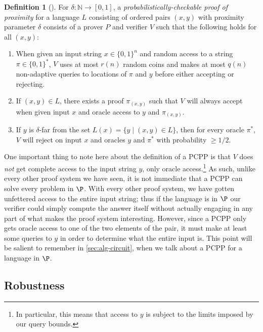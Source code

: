 \documentclass[english,12pt]{reedthesis}
\theoremstyle{plain}
\theoremstyle{definition}
\newtheorem{defn}[defn]{Definition}
\theoremstyle{remark}
\begin{document}
\begin{defn}[{\cite[Def.\ 2.2]{GOS25}}]\label{def:pcpp}
  For $\delta\colon \mathbb{N} \rightarrow [0, 1]$, a \emph{probabilistically-checkable proof of
    proximity} for a language $L$ consisting of ordered pairs $(x, y)$ with
  proximity parameter $\delta$ consists of a prover $P$ and verifier $V$ such that
  the following holds for all $(x, y)$:
  \begin{enumerate}
    \item When given an input string $x \in \{0, 1\}^{n}$ and random access to a
          string $\pi \in \{0, 1\}^{*}$, $V$ uses at most $r(n)$ random coins and
          makes at most $q(n)$ non-adaptive queries to locations of $\pi$ and $y$
          before either accepting or rejecting.
    \item If $(x, y) \in L$, there exists a proof $\pi_{(x, y)}$ such that $V$ will
          always accept when given input $x$ and oracle access to $y$ and
          $\pi_{(x, y)}$.
    \item If $y$ is $\delta$-far from the set $L(x) = \{y \mid (x, y) \in L\}$, then for
          every oracle $\pi^{*}$, $V$ will reject on input $x$ and oracles $y$ and
          $\pi^{*}$ with probability $\ge 1/2$.
  \end{enumerate}
\end{defn}

One important thing to note here about the definition of a PCPP is that $V$ does
\emph{not} get complete access to the input string $y$, only oracle
access.\footnote{In particular, this means that access to $y$ is subject to the
  limits imposed by our query bounds.} As such, unlike every other proof system
we have seen, it is not immediate that a PCPP can solve every problem in $\P$.
With every other proof system, we have gotten unfettered access to the entire
input string; thus if the language is in $\P$ our verifier could simply compute
the answer itself without actually engaging in any part of what makes the proof
system interesting. However, since a PCPP only gets oracle access to one of the
two elements of the pair, it must make at least some queries to $y$ in order to
determine what the entire input is. This point will be salient to remember in
\cref{sec:alg-circuit}, when we talk about a PCPP for a language in $\P$.

\subsection{Robustness}\label{sec:robust-verifiers}
\end{document}

